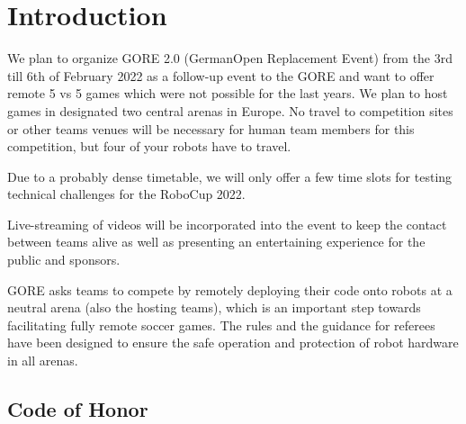 \section{Introduction}

We plan to organize GORE 2.0 (GermanOpen Replacement Event) from the 3rd till 6th of February 2022 as a follow-up event to the GORE and want to offer remote 5 vs 5 games which were not possible for the last years. We plan to host games in designated two central arenas in Europe. 
No travel to competition sites or other teams venues will be necessary for human team members for this competition, but four of your robots have to travel.

Due to a probably dense timetable, we will only offer a few time slots for testing technical challenges for the RoboCup 2022.

Live-streaming of videos will be incorporated into the event to keep the contact between teams alive as well as presenting an entertaining experience for the public and sponsors.

GORE asks teams to compete by remotely deploying their code onto robots at a neutral arena (also the hosting teams), which is an important step towards facilitating fully remote soccer games. The rules and the guidance for referees have been designed to ensure the safe operation and protection of robot hardware in all arenas.

\subsection{Code of Honor}

